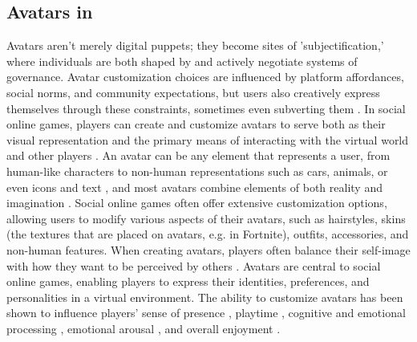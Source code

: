 \subsection{Avatars in }
Avatars aren't merely digital puppets; they become sites of 'subjectification,' where individuals are both shaped by and actively negotiate systems of governance. Avatar customization choices are influenced by platform affordances, social norms, and community expectations, but users also creatively express themselves through these constraints, sometimes even subverting them \cite{bardzell2014lonely}. In social online games, players can create and customize avatars to serve both as their visual representation and the primary means of interacting with the virtual world and other players \cite{szolin2022gaming, castronova2003theory, mazlan2012students}. An avatar can be any element that represents a user, from human-like characters to non-human representations such as cars, animals, or even icons and text \cite{boberg2008designing}, and most avatars combine elements of both reality and imagination \cite{mazlan2012students}. Social online games often offer extensive customization options, allowing users to modify various aspects of their avatars, such as hairstyles, skins (the textures that are placed on avatars, e.g. in Fortnite), outfits, accessories, and non-human features. When creating avatars, players often balance their self-image with how they want to be perceived by others \cite{szolin2022gaming}. Avatars are central to social online games, enabling players to express their identities, preferences, and personalities in a virtual environment. The ability to customize avatars has been shown to influence players’ sense of presence \cite{bailey2009avatar}, playtime \cite{castronova2003theory}, cognitive and emotional processing \cite{bailey2009avatar}, emotional arousal \cite{chung2008avatar},  and overall enjoyment \cite{turkay2010enjoyment, bailey2009avatar, Birk2016, trepte2010avatar}. 

